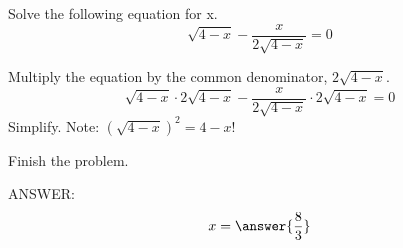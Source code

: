 \documentclass{ximera}
\author{Nela Lakos}
\begin{document}
\begin{exercise}
Solve the following equation for x.
\[
\sqrt{4-x}-\frac{x}{2\sqrt{4-x}}=0
\]
\begin{hint}

Multiply the equation by the common denominator, $2\sqrt{4-x}$.
\[
\sqrt{4-x}\cdot2\sqrt{4-x}-\frac{x}{2\sqrt{4-x}}\cdot2\sqrt{4-x}=0
\]
Simplify. Note: $(\sqrt{4-x})^2=4-x$!

Finish the problem.
\end{hint}
ANSWER: 
\[
x=\answer{\frac{8}{3}}
\]
\end{exercise}
\end{document}
